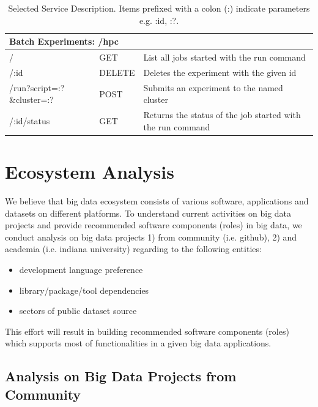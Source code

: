 \documentclass[9pt,twocolumn,twoside]{styles/osajnl}
\newcommand{\grey}{\cellcolor{lightgray}}  %
\begin{document}
\begin{table}[htb]
\begin{center}
\begin{small}
\begin{tabular}{|l|l|l|}
\hline \multicolumn{3}{|l|}{\grey\bf Batch Experiments: /hpc} \tabularnewline \hline
/                          & GET    & List all jobs started with the run command \tabularnewline \hline
/:id                       & DELETE & Deletes the experiment with the given id \tabularnewline \hline
/run?script=:?\&cluster=:? & POST   & Submits an experiment to the named cluster \tabularnewline \hline
/:id/status                & GET    & Returns the status of the job started with the run command \tabularnewline \hline

      \end{tabular}
    \end{small}
    \caption{Selected Service Description. Items prefixed with a colon (:) indicate parameters e.g. :id, :?.}
    \label{T:rest}
  \end{center}
\end{table}

\section{Ecosystem Analysis}

We believe that big data ecosystem consists of various software,
applications and datasets on different platforms. To understand
current activities on big data projects and provide recommended
software components (roles) in big data, we conduct analysis on big
data projects 1) from community (i.e. github), 2) and academia
(i.e. indiana university) regarding to the following entities:

\begin{itemize}
\item development language preference
\item library/package/tool dependencies
\item sectors of public dataset source
\end{itemize}

This effort will result in building recommended software components
(roles) which supports most of functionalities in a given big data
applications.

\subsection{Analysis on Big Data Projects from Community}
\end{document}
